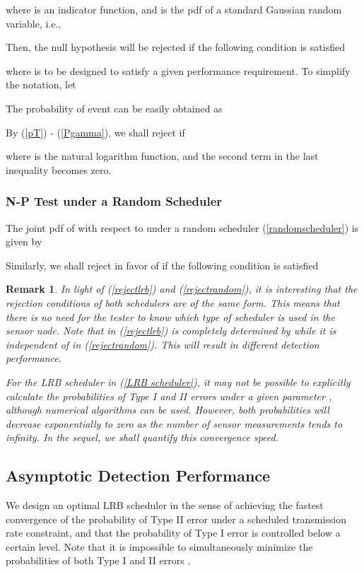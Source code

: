 \documentclass[journal]{IEEEtran}
\newtheorem{rem}{Remark}
\begin{document}
where  is an indicator function, and  is the pdf of a standard Gaussian random variable, i.e.,




Then, the null hypothesis will be rejected if the following condition is satisfied

where  is to be designed to satisfy a given performance requirement. To simplify the notation, let

The probability of event  can be easily obtained as

By (\ref{pT}) - (\ref{Pgamma}), we shall reject  if

where  is the natural logarithm function, and the second term in the last inequality becomes zero.

\subsubsection{N-P Test under a Random Scheduler}
The joint pdf of  with respect to  under a random scheduler (\ref{randomscheduler}) is given by

Similarly, we shall reject  in favor of  if the following condition is satisfied

\begin{rem}
In light of (\ref{rejectlrb}) and (\ref{rejectrandom}), it is interesting that the rejection conditions of both schedulers are of the same form. This means that there is no need for the tester to know which type of scheduler is used in the sensor node. Note that  in (\ref{rejectlrb}) is completely determined by  while it is independent of  in  (\ref{rejectrandom}). This will result in different detection performance.

For the LRB scheduler in  (\ref{LRB scheduler}),  it may not be possible to explicitly calculate the probabilities of Type I and II errors  under a given parameter , although numerical algorithms can be used.  However, both probabilities will decrease exponentially to zero as the number of sensor measurements tends to infinity.  In the sequel, we shall quantify this convergence speed.
\end{rem}
\subsection{Asymptotic Detection Performance}
\label{sec_atp}
We  design an optimal LRB scheduler in the sense of achieving the fastest convergence of the probability of Type II error under a scheduled transmission rate constraint, and that the probability of Type I error is controlled below a certain level. Note that it is impossible to simultaneously minimize the probabilities of both Type I and II errors \cite{casella2001statistical}.
\end{document}
